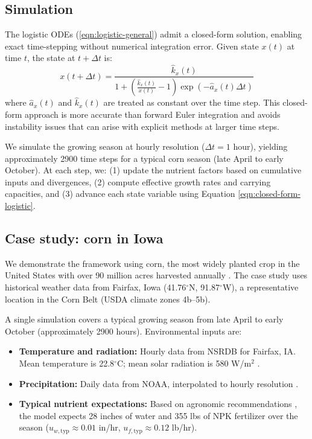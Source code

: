 \documentclass[preprint,12pt]{elsarticle}
\newcommand{\df}[2]{\displaystyle\frac{#1}{#2}}
\begin{document}
\subsection{Simulation}\label{subsec:simulation}

The logistic ODEs (\ref{eqn:logistic-general}) admit a closed-form solution, enabling exact time-stepping without numerical integration error. Given state $x(t)$ at time $t$, the state at $t + \Delta t$ is:
\begin{equation}
x(t + \Delta t) = \df{\hat{k}_{x}(t)}{1 + \left(\df{\hat{k}_{x}(t)}{x(t)} - 1\right)\exp(-\hat{a}_{x}(t)\Delta t)}
\label{eqn:closed-form-logistic}
\end{equation}
where $\hat{a}_{x}(t)$ and $\hat{k}_{x}(t)$ are treated as constant over the time step. This closed-form approach is more accurate than forward Euler integration and avoids instability issues that can arise with explicit methods at larger time steps.

We simulate the growing season at hourly resolution ($\Delta t = 1$ hour), yielding approximately 2900 time steps for a typical corn season (late April to early October). At each step, we: (1) update the nutrient factors based on cumulative inputs and divergences, (2) compute effective growth rates and carrying capacities, and (3) advance each state variable using Equation \ref{eqn:closed-form-logistic}.

\subsection{Case study: corn in Iowa}\label{subsec:case-study}

We demonstrate the framework using corn, the most widely planted crop in the United States with over 90 million acres harvested annually \cite{fsa-acreage}. The case study uses historical weather data from Fairfax, Iowa (41.76$^{\circ}$N, 91.87$^{\circ}$W), a representative location in the Corn Belt (USDA climate zones 4b--5b).

A single simulation covers a typical growing season from late April to early October (approximately 2900 hours). Environmental inputs are:

\begin{itemize}
\item \textbf{Temperature and radiation:} Hourly data from NSRDB for Fairfax, IA. Mean temperature is 22.8$^{\circ}$C; mean solar radiation is 580 W/m$^{2}$ \cite{NSRDB}.
\item \textbf{Precipitation:} Daily data from NOAA, interpolated to hourly resolution \cite{noaa-precip}.
\item \textbf{Typical nutrient expectations:} Based on agronomic recommendations \cite{corn-nutrient-management}, the model expects 28 inches of water and 355 lbs of NPK fertilizer over the season ($u_{w,\text{typ}} \approx 0.01$ in/hr, $u_{f,\text{typ}} \approx 0.12$ lb/hr).
\end{itemize}
\end{document}
